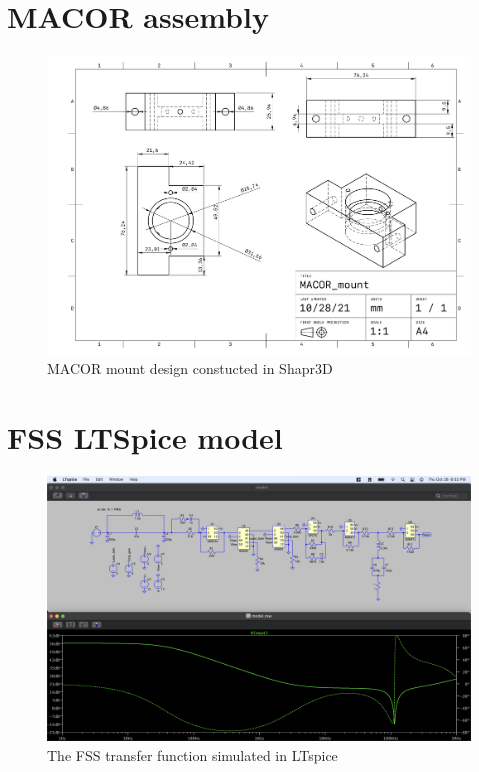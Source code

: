 \section{MACOR assembly}

\begin{figure}[H]
\includegraphics[width=\textwidth]{figs/ALGAAS/MACOR_mount.pdf}
\caption{MACOR mount design constucted in Shapr3D
\\
}
\label{fig:macor_mount_design}
\end{figure}

\section{FSS LTSpice model}

\begin{figure}[H]
\includegraphics[width=\textwidth]{figs/ALGAAS/spice_FSS_tf.png}
\caption{The FSS transfer function simulated in LTspice}
\label{fig:spiceFSS}
\end{figure}